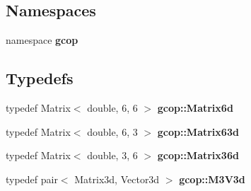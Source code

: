 \subsection*{\-Namespaces}
\begin{DoxyCompactItemize}
\item 
namespace {\bf gcop}
\end{DoxyCompactItemize}
\subsection*{\-Typedefs}
\begin{DoxyCompactItemize}
\item 
typedef \-Matrix$<$ double, 6, 6 $>$ {\bf gcop\-::\-Matrix6d}
\item 
typedef \-Matrix$<$ double, 6, 3 $>$ {\bf gcop\-::\-Matrix63d}
\item 
typedef \-Matrix$<$ double, 3, 6 $>$ {\bf gcop\-::\-Matrix36d}
\item 
typedef pair$<$ \-Matrix3d, \-Vector3d $>$ {\bf gcop\-::\-M3\-V3d}
\end{DoxyCompactItemize}
